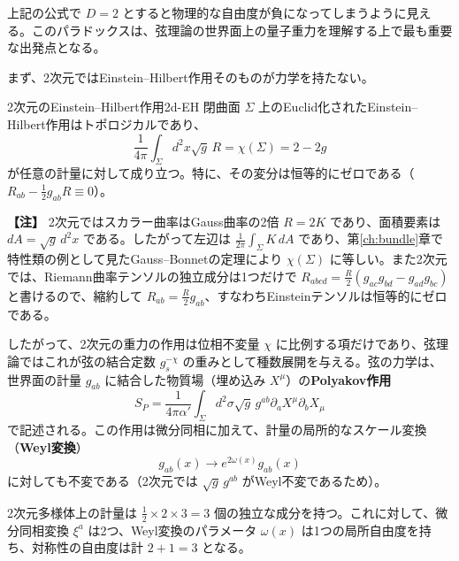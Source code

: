 \documentclass[uplatex, dvipdfmx, book]{jsbook}
\newenvironment{note}{\vspace{1ex}\par\footnotesize\noindent\textbf{【注】}}{\par\vspace{1ex}}
\begin{document}
上記の公式で $D = 2$ とすると物理的な自由度が負になってしまうように見える。このパラドックスは、弦理論の世界面上の量子重力を理解する上で最も重要な出発点となる。

まず、2次元ではEinstein--Hilbert作用そのものが力学を持たない。

\begin{myprop}{2次元のEinstein--Hilbert作用}{2d-EH}
閉曲面 $\Sigma$ 上のEuclid化されたEinstein--Hilbert作用はトポロジカルであり、
\begin{equation*}
    \frac{1}{4\pi}\int_\Sigma d^2x \sqrt{g}\, R = \chi(\Sigma) = 2 - 2g
\end{equation*}
が任意の計量に対して成り立つ。特に、その変分は恒等的にゼロである（$R_{ab} - \frac{1}{2}g_{ab}R \equiv 0$）。
\end{myprop}

\begin{note}
2次元ではスカラー曲率はGauss曲率の2倍 $R = 2K$ であり、面積要素は $dA = \sqrt{g}\,d^2x$ である。したがって左辺は $\frac{1}{2\pi}\int_\Sigma K\, dA$ であり、第\ref{ch:bundle}章で特性類の例として見たGauss--Bonnetの定理により $\chi(\Sigma)$ に等しい。また2次元では、Riemann曲率テンソルの独立成分は1つだけで $R_{abcd} = \frac{R}{2}(g_{ac}g_{bd} - g_{ad}g_{bc})$ と書けるので、縮約して $R_{ab} = \frac{R}{2}g_{ab}$、すなわちEinsteinテンソルは恒等的にゼロである。
\end{note}

したがって、2次元の重力の作用は位相不変量 $\chi$ に比例する項だけであり、弦理論ではこれが弦の結合定数 $g_s^{-\chi}$ の重みとして種数展開を与える。弦の力学は、世界面の計量 $g_{ab}$ に結合した物質場（埋め込み $X^\mu$）の\textbf{Polyakov作用}
\begin{equation}
    S_P = \frac{1}{4\pi\alpha'}\int_\Sigma d^2\sigma \sqrt{g}\, g^{ab}\partial_a X^\mu \partial_b X_\mu
\end{equation}
で記述される\cite{polchinskistringtheoryvolume12005}。この作用は微分同相に加えて、計量の局所的なスケール変換（\textbf{Weyl変換}）
\begin{equation}
    g_{ab}(x) \to e^{2\omega(x)} g_{ab}(x)
\end{equation}
に対しても不変である（2次元では $\sqrt{g}\,g^{ab}$ がWeyl不変であるため）。

2次元多様体上の計量は $\frac{1}{2} \times 2 \times 3 = 3$ 個の独立な成分を持つ。これに対して、微分同相変換 $\xi^a$ は2つ、Weyl変換のパラメータ $\omega(x)$ は1つの局所自由度を持ち、対称性の自由度は計 $2 + 1 = 3$ となる。
\end{document}
